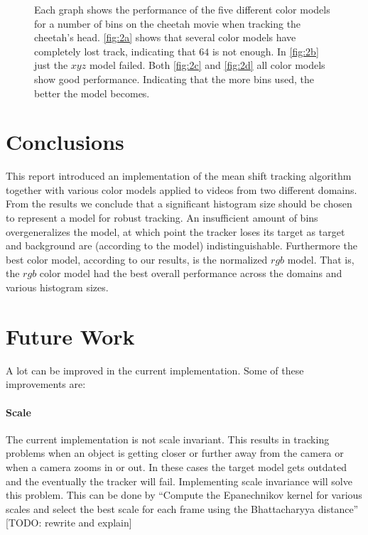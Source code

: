 \documentclass[11pt]{article}
\begin{document}
\begin{figure}
{\label{fig:2c}
}
\caption{Each graph shows the performance of the five different color models for
a number of bins on the cheetah movie when tracking the cheetah's head.
\ref{fig:2a} shows that several color models have completely lost track,
indicating that $64$ is not enough. In \ref{fig:2b} just the $xyz$ model failed.
Both \ref{fig:2c} and \ref{fig:2d} all color models show good performance.
Indicating that the more bins used, the better the model becomes.}
\label{fig:cheetah}
\end{figure}

\section{Conclusions} \label{sec:conclusion}
This report introduced an implementation of the mean shift tracking algorithm
together with various color models applied to videos from two different domains.
From the results we conclude that a significant histogram size should be chosen
to represent a model for robust tracking. An insufficient amount of bins
overgeneralizes the model, at which point the tracker loses its target as
target and background are (according to the model) indistinguishable.
Furthermore the best color model, according to our results, is the normalized
$rgb$ model. That is, the $rgb$ color model had the best overall performance
across the domains and various histogram sizes.

\section{Future Work} \label{sec:future}
A lot can be improved in the current implementation. Some of these improvements
are:
\paragraph{Scale} The current implementation is not scale invariant. This
results in tracking problems when an object is getting closer or further away
from the camera or when a camera zooms in or out. In these cases the target
model gets outdated and the eventually the tracker will fail. Implementing
scale invariance will solve this problem. This can be done by ``Compute the
Epanechnikov kernel for various scales and select the best scale for each
frame using the Bhattacharyya distance'' [TODO: rewrite and explain]
\end{document}
